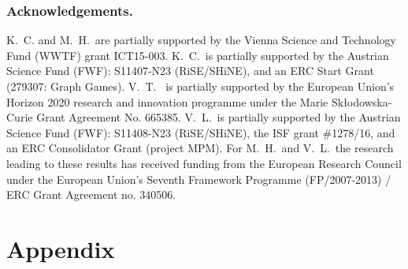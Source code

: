 \documentclass[a4paper,envcountsame]{llncs}
\begin{document}









\subsubsection*{Acknowledgements.}
K.~C. and M.~H.\ are partially supported by
the Vienna Science and Technology Fund (WWTF) grant ICT15-003.
K.~C.\ is partially supported by
the Austrian Science Fund (FWF): S11407-N23 (RiSE/SHiNE), and an ERC Start Grant (279307: Graph Games).
V.~T. \ is partially supported by
the European Union’s Horizon 2020 research and innovation programme under the Marie Skłodowska-Curie Grant Agreement No. 665385.
V.~L.~is partially supported by
the Austrian Science Fund (FWF): S11408-N23 (RiSE/SHiNE), the ISF grant \#1278/16, and an ERC Consolidator Grant (project MPM).
For M.~H.\ and V.~L.\ the research leading to these results has received funding from
the European Research Council under the European Union's Seventh Framework Programme (FP/2007-2013) / ERC Grant Agreement no. 340506.




\clearpage
\section*{Appendix}
\appendix

\end{document}
